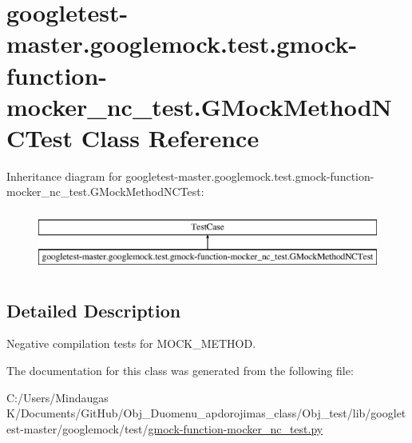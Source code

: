 \hypertarget{classgoogletest-master_1_1googlemock_1_1test_1_1gmock-function-mocker__nc__test_1_1_g_mock_method_n_c_test}{}\section{googletest-\/master.googlemock.\+test.\+gmock-\/function-\/mocker\+\_\+nc\+\_\+test.G\+Mock\+Method\+N\+C\+Test Class Reference}
\label{classgoogletest-master_1_1googlemock_1_1test_1_1gmock-function-mocker__nc__test_1_1_g_mock_method_n_c_test}
Inheritance diagram for googletest-\/master.googlemock.\+test.\+gmock-\/function-\/mocker\+\_\+nc\+\_\+test.G\+Mock\+Method\+N\+C\+Test\+:\begin{figure}[H]
\begin{center}
\leavevmode
\includegraphics[height=2.000000cm]{d8/ddb/classgoogletest-master_1_1googlemock_1_1test_1_1gmock-function-mocker__nc__test_1_1_g_mock_method_n_c_test}
\end{center}
\end{figure}


\subsection{Detailed Description}
\begin{DoxyVerb}Negative compilation tests for MOCK_METHOD.\end{DoxyVerb}
 

The documentation for this class was generated from the following file\+:\begin{DoxyCompactItemize}
\item 
C\+:/\+Users/\+Mindaugas K/\+Documents/\+Git\+Hub/\+Obj\+\_\+\+Duomenu\+\_\+apdorojimas\+\_\+class/\+Obj\+\_\+test/lib/googletest-\/master/googlemock/test/\mbox{\hyperlink{_obj__test_2lib_2googletest-master_2googlemock_2test_2gmock-function-mocker__nc__test_8py}{gmock-\/function-\/mocker\+\_\+nc\+\_\+test.\+py}}\end{DoxyCompactItemize}
